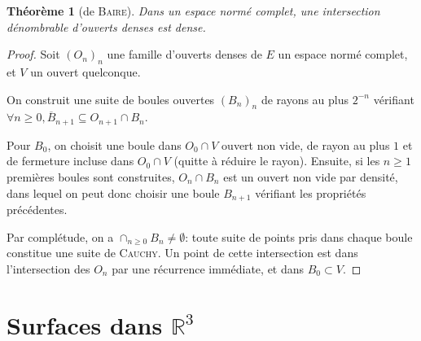 \documentclass[a4paper]{article}
\newcommand{\R}{\mathbb{R}}
\newcommand{\oB}{\overline{B}}
\newtheorem*{thm*}{Théorème}
\theoremstyle{definition}
\begin{document}
\begin{thm*}[de \textsc{Baire}]
	Dans un espace normé complet, une intersection dénombrable d'ouverts denses est dense.
\end{thm*}
\begin{proof}
	Soit $(O_n)_n$ une famille d'ouverts denses de $E$ un espace normé complet, et $V$ un ouvert quelconque.

	On construit une suite de boules ouvertes $(B_n)_n$ de rayons au plus $2^{-n}$ vérifiant $\forall n\geq0, \oB_{n+1} \subseteq O_{n+1}\cap B_n$.

	Pour $B_0$, on choisit une boule dans $O_0 \cap V$ ouvert non vide, de rayon au plus $1$ et de fermeture incluse dans $O_0 \cap V$ (quitte à réduire le rayon).
	Ensuite, si les $n\geq1$ premières boules sont construites, $O_{n} \cap B_n$ est un ouvert non vide par densité, dans lequel on peut donc choisir une boule $B_{n+1}$ vérifiant les propriétés précédentes.

	Par complétude, on a $\cap_{n\geq0} B_n \neq \emptyset$: toute suite de points pris dans chaque boule constitue une suite de \textsc{Cauchy}.
	Un point de cette intersection est dans l'intersection des $O_n$ par une récurrence immédiate, et dans $B_0 \subset V$.
\end{proof}

\section{Surfaces dans $\R^3$}
\end{document}
